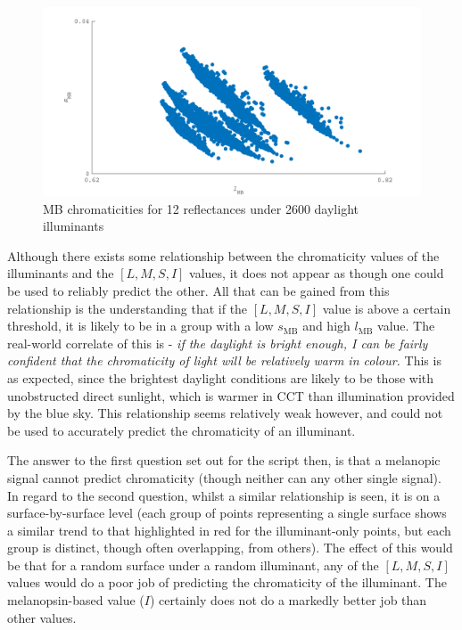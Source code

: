 \begin{figure}[htbp]
    \includegraphics[max width=\textwidth]{figs/comp/melcomp_1/BasicMB.pdf}
    \caption{\gls{MB} chromaticities for 12 reflectances under 2600 daylight illuminants}
    \label{fig:mb}
\end{figure} 

Although there exists some relationship between the chromaticity values of the illuminants and the $[L,M,S,I]$ values, it does not appear as though one could be used to reliably predict the other. All that can be gained from this relationship is the understanding that if the $[L,M,S,I]$ value is above a certain threshold, it is likely to be in a group with a low $s_{\text{MB}}$ and high $l_{\text{MB}}$ value. The real-world correlate of this is - \textit{if the daylight is bright enough, I can be fairly confident that the chromaticity of light will be relatively warm in colour.} This is as expected, since the brightest daylight conditions are likely to be those with unobstructed direct sunlight, which is warmer in \gls{CCT} than illumination provided by the blue sky. This relationship seems relatively weak however, and could not be used to accurately predict the chromaticity of an illuminant. 

The answer to the first question set out for the script then, is that a melanopic signal cannot predict chromaticity (though neither can any other single signal). In regard to the second question, whilst a similar relationship is seen, it is on a surface-by-surface level (each group of points representing a single surface shows a similar trend to that highlighted in red for the illuminant-only points, but each group is distinct, though often overlapping, from others). The effect of this would be that for a random surface under a random illuminant, any of the $[L,M,S,I]$ values would do a poor job of predicting the chromaticity of the illuminant. The melanopsin-based value ($I$) certainly does not do a markedly better job than other values.

